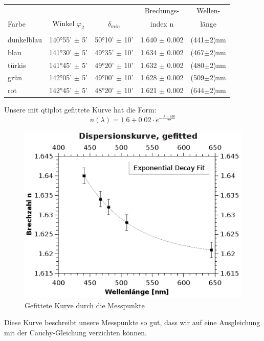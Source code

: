 \documentclass{article}
\begin{document}
\begin{center}
\begin{tabular}{|l|c|c|c|c|}
\hline & & & Brechungs- & Wellen-\\
Farbe & Winkel $\varphi_2$ & $\delta_{min}$ & index n & länge\\
\hline
& & & &\\
dunkelblau & 140°55' $\pm$ 5' & 50°10' $\pm$ 10' & 1.640 $\pm$ 0.002 & (441$\pm$2)nm\\
blau & 141°30' $\pm$ 5' & 49°35' $\pm$ 10' & 1.634 $\pm$ 0.002 & (467$\pm$2)nm\\
türkis & 141°45' $\pm$ 5' & 49°20' $\pm$ 10' & 1.632 $\pm$ 0.002 & (480$\pm$2)nm\\
grün & 142°05' $\pm$ 5' & 49°00' $\pm$ 10' & 1.628 $\pm$ 0.002 & (509$\pm$2)nm\\
rot & 142°45' $\pm$ 5' & 48°20' $\pm$ 10' & 1.621 $\pm$ 0.002 & (644$\pm$2)nm\\
\hline
\end{tabular}
\end{center}
Unsere mit qtiplot gefittete Kurve hat die Form:
\begin{equation}
n(\lambda)=1.6 +0.02 \cdot e^{-\frac{\lambda-430}{77}}
\end{equation}
\begin{center}
\begin{figure}
\caption{Gefittete Kurve durch die Messpunkte}
\includegraphics[scale=0.7]{fit.eps}
\end{figure}
\end{center}
Diese Kurve beschreibt unsere Messpunkte so gut, dass wir auf eine Ausgleichung mit der Cauchy-Gleichung verzichten können.
\end{document}
